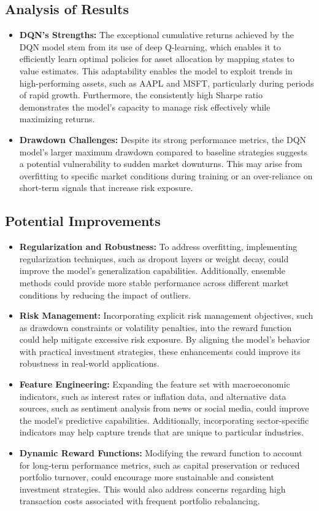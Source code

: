\documentclass[conference]{IEEEtran}
\begin{document}
\subsection{Analysis of Results}
\begin{itemize}
    \item \textbf{DQN's Strengths:} The exceptional cumulative returns achieved by the DQN model stem from its use of deep Q-learning, which enables it to efficiently learn optimal policies for asset allocation by mapping states to value estimates. This adaptability enables the model to exploit trends in high-performing assets, such as AAPL and MSFT, particularly during periods of rapid growth. Furthermore, the consistently high Sharpe ratio demonstrates the model's capacity to manage risk effectively while maximizing returns.
    \item \textbf{Drawdown Challenges:} Despite its strong performance metrics, the DQN model's larger maximum drawdown compared to baseline strategies suggests a potential vulnerability to sudden market downturns. This may arise from overfitting to specific market conditions during training or an over-reliance on short-term signals that increase risk exposure.
\end{itemize}

\subsection{Potential Improvements}
\begin{itemize}
    \item \textbf{Regularization and Robustness:} To address overfitting, implementing regularization techniques, such as dropout layers or weight decay, could improve the model's generalization capabilities. Additionally, ensemble methods could provide more stable performance across different market conditions by reducing the impact of outliers.
    \item \textbf{Risk Management:} Incorporating explicit risk management objectives, such as drawdown constraints or volatility penalties, into the reward function could help mitigate excessive risk exposure. By aligning the model's behavior with practical investment strategies, these enhancements could improve its robustness in real-world applications.
    \item \textbf{Feature Engineering:} Expanding the feature set with macroeconomic indicators, such as interest rates or inflation data, and alternative data sources, such as sentiment analysis from news or social media, could improve the model's predictive capabilities. Additionally, incorporating sector-specific indicators may help capture trends that are unique to particular industries.
    \item \textbf{Dynamic Reward Functions:} Modifying the reward function to account for long-term performance metrics, such as capital preservation or reduced portfolio turnover, could encourage more sustainable and consistent investment strategies. This would also address concerns regarding high transaction costs associated with frequent portfolio rebalancing.
\end{itemize}
\end{document}
